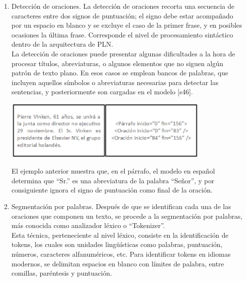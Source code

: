\begin{enumerate}
    \item Detección de oraciones. La detección de oraciones recorta una secuencia de caracteres entre dos signos de puntuación; el signo debe estar acompañado por un espacio en blanco y se excluye el caso de la primer frase, y en posibles ocasiones la última frase. Corresponde el nivel de procesamiento sintáctico dentro de la arquitectura de PLN.\\
    
La detección de oraciones puede presentar algunas dificultades a la hora de procesar títulos, abreviaturas, o algunos elementos que no siguen algún patrón de texto plano. En esos casos se emplean bancos de palabras, que incluyen aquellos símbolos o abreviaturas necesarias para detectar las sentencias, y posteriormente son cargadas en el modelo [s46].
\begin{center}
    \includegraphics[width=0.8\textwidth]{Images/Cap 2/Deteccion_Oraciones.png}
\end{center}
El ejemplo anterior muestra que, en el párrafo, el modelo en español determina que “Sr.” es una abreviatura de la palabra “Señor”, y por consiguiente ignora el signo de puntuación como final de la oración.

\item Segmentación por palabras. Después de que se identifican cada una de las oraciones que componen un texto, se procede a la segmentación por palabras, más conocida como analizador léxico o “Tokenizer”.\\


Esta técnica, perteneciente al nivel léxico, consiste en la identificación de tokens, los cuales son unidades lingüísticas como palabras, puntuación, números, caracteres alfanuméricos, etc. Para identificar tokens en idiomas modernos, se delimitan espacios en blanco con límites de palabra, entre comillas, paréntesis y puntuación.\\


\end{enumerate}
